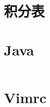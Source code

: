 \documentclass[titlepage,landscape,a4paper,10pt]{article}
\begin{document}
\section{积分表}


\begin{multicols}{2}
\begin{spacing}{0.8}

\section{Java}
\inputminted{java}{src/Main.java}

\section{Vimrc}
\inputminted{text}{src/vimrc.vim}
\end{spacing}

\end{multicols}
\end{document}
